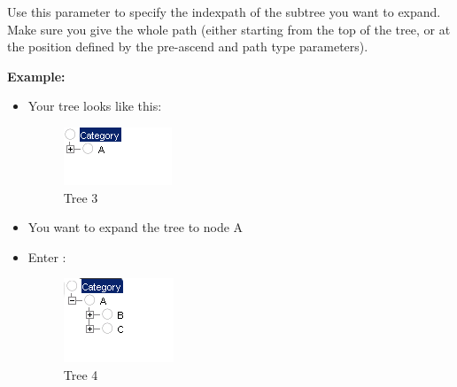 
Use this parameter to specify the indexpath of the subtree you want to expand.   Make sure you give the whole path (either starting from the top of the tree, or at the position defined by the pre-ascend and path type parameters).




\textbf{Example:}

\begin{itemize}
\item Your tree looks like this:

\begin{figure}
\begin{center}
\includegraphics{PS/Treeexample3}
\caption{Tree 3}
\label{treeexample3}
\end{center}
\end{figure}

\item You want to expand the tree to node A
\item Enter :

\begin{figure}
\begin{center}
\includegraphics{PS/Treeexample4}
\caption{Tree 4}
\label{treeexample4}
\end{center}
\end{figure}
\end{itemize}
